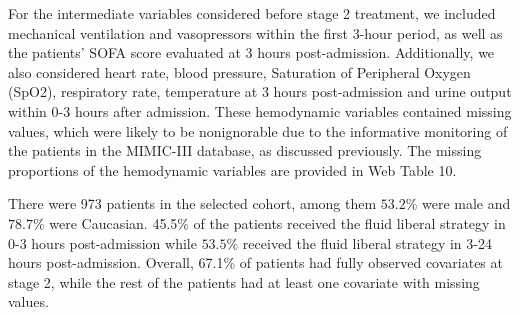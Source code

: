 \documentclass[12pt]{article}
\begin{document}
For the intermediate variables considered before stage 2 treatment, we included mechanical ventilation and vasopressors within the first 3-hour period, as well as the patients' SOFA score evaluated at 3 hours post-admission. Additionally, we also considered heart rate, blood pressure, Saturation of Peripheral Oxygen (SpO2), respiratory rate, temperature at 3 hours post-admission and urine output within 0-3 hours after admission. These hemodynamic variables contained missing values, which were likely to be nonignorable due to the informative monitoring of the patients in the MIMIC-III database, as discussed previously.
The missing proportions of the hemodynamic variables are provided in Web Table 10. 


There were 973 patients in the selected cohort, among them $53.2\%$ were male and $78.7\%$ were Caucasian. 45.5\% of the patients received the fluid liberal strategy in 0-3 hours post-admission while $53.5\%$ received the fluid liberal strategy in 3-24 hours post-admission. Overall, 67.1\% of patients had fully observed covariates at stage 2, while the rest of the patients had at least one covariate with missing values. 
\end{document}
